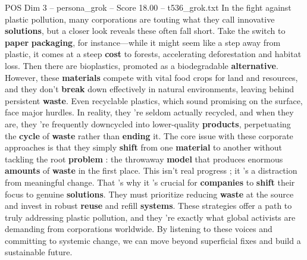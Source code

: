 \begin{textsample}{POS Dim 3 – persona\_grok – Score 18.00 – t536\_grok.txt}  \label{ex:f3_pos_032}
In the fight against plastic pollution, many corporations are touting what they call innovative \textbf{solutions}, but a closer look reveals these often fall short.
Take the switch to \textbf{paper} \textbf{packaging}, for instance—while it might seem like a step away from plastic, it comes at a steep \textbf{cost} to forests, accelerating deforestation and habitat loss.
Then there are bioplastics, promoted as a biodegradable \textbf{alternative}.
However, these \textbf{materials} compete with vital food crops for land and resources, and they don't \textbf{break} down effectively in natural environments, leaving behind persistent \textbf{waste}.
Even recyclable plastics, which sound promising on the surface, face major hurdles.
In reality, they 're seldom actually recycled, and when they are, they 're frequently downcycled into lower-quality \textbf{products}, perpetuating the \textbf{cycle} of \textbf{waste} rather than \textbf{ending} it.
The core issue with these corporate approaches is that they simply \textbf{shift} from one \textbf{material} to another without tackling the root \textbf{problem} : the throwaway \textbf{model} that produces enormous \textbf{amounts} of \textbf{waste} in the first place.
This isn't real progress ; it 's a distraction from meaningful change.
That 's why it 's crucial for \textbf{companies} to \textbf{shift} their focus to genuine \textbf{solutions}.
They must prioritize reducing \textbf{waste} at the source and invest in robust \textbf{reuse} and refill \textbf{systems}.
These strategies offer a path to truly addressing plastic pollution, and they 're exactly what global activists are demanding from corporations worldwide.
By listening to these voices and committing to systemic change, we can move beyond superficial fixes and build a sustainable future.

\end{textsample}
